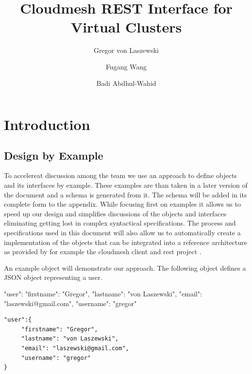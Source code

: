 \documentclass[9pt,twocolumn,twoside]{styles/osajnl}
\title{Cloudmesh REST Interface for Virtual Clusters}
\author[1,*]{Gregor von Laszewski}
\author[1]{Fugang Wang}
\author[1]{Badi Abdhul-Wahid}
\affil[1]{School of Informatics and Computing, Bloomington, IN 47408, U.S.A.}
\affil[*]{Corresponding authors: laszewski@gmal.com}
\begin{document}
\flushbottom %

\maketitle %

\tableofcontents %
\maketitle

\section{Introduction}

\subsection{Design by Example}

To accelereat discussion among the team we use an approach to define
objects and its interfaces by  example. These examples are than taken
in a later version of the document and a schema is generated from
it. The schema will be added in its complete form to the
appendix. While focusing first on examples it allows us to speed up
our design and simplifies discussions of the objects and interfaces
eliminating getting lost in complex syntactical specifications. The
process and specifications used in this document will also allow us to
automatically create a implementation of the objects that can be
integrated into a reference architecture as provided by for example
the cloudmesh client and rest project \cite{??}.  

An example object will demonstrate our approach. The following object
defines a JSON object representing a user. 

\begin{json}
"user":{  
     "firstname": "Gregor",  
     "lastname": "von Laszewski",  
     "email": "laszewski@gmail.com",  
     "username": "gregor" 
}
\end{json}


\begin{Verbatim}
"user":{  
     "firstname": "Gregor",  
     "lastname": "von Laszewski",  
     "email": "laszewski@gmail.com",  
     "username": "gregor" 
}
\end{Verbatim}
 
\end{document}
